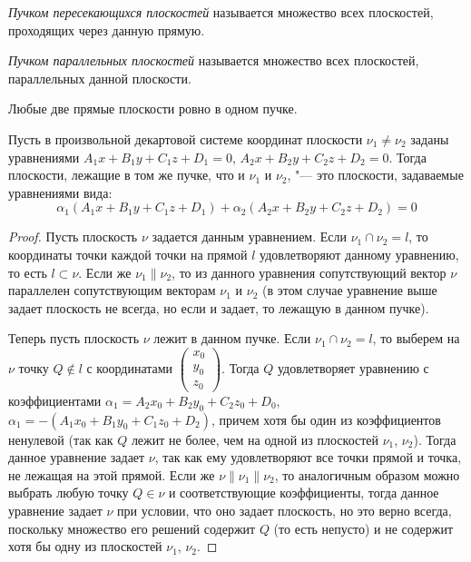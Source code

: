 \begin{definition}
	\textit{Пучком пересекающихся плоскостей} называется множество всех плоскостей, проходящих через данную прямую.
\end{definition}

\begin{definition}
	\textit{Пучком параллельных плоскостей} называется множество всех плоскостей, параллельных данной плоскости.
\end{definition}

\begin{note}
	Любые две прямые плоскости ровно в одном пучке.
\end{note}

\begin{theorem}
	Пусть в произвольной декартовой системе координат плоскости $\nu_1 \ne \nu_2$ заданы уравнениями $A_1x+B_1y+C_1z+D_1=0$, $A_2x+B_2y+C_2z+D_2=0$. Тогда плоскости, лежащие в том же пучке, что и $\nu_1$ и $\nu_2$, "--- это плоскости, задаваемые уравнениями вида:
	\[\alpha_1(A_1x+B_1y+C_1z+D_1) + \alpha_2(A_2x+B_2y+C_2z+D_2) = 0\]
\end{theorem}

\begin{proof}
	Пусть плоскость $\nu$ задается данным уравнением. Если $\nu_1 \cap \nu_2 = l$, то координаты точки каждой точки на прямой $l$ удовлетворяют данному уравнению, то есть $l \subset \nu$. Если же $\nu_1 \parallel \nu_2$, то из данного уравнения сопутствующий вектор $\nu$ параллелен сопутствующим векторам $\nu_1$ и $\nu_2$ (в этом случае уравнение выше задает плоскость не всегда, но если и задает, то лежащую в данном пучке).
	
	Теперь пусть плоскость $\nu$ лежит в данном пучке. Если $\nu_1 \cap \nu_2 = l$, то выберем на $\nu$ точку $Q \not\in l$ с координатами $\begin{pmatrix}x_0\\y_0\\z_0\end{pmatrix}$. Тогда $Q$ удовлетворяет уравнению с коэффициентами $\alpha_1 = A_2x_0+B_2y_0+C_2z_0+D_0$, $\alpha_1 = -(A_1x_0+B_1y_0+C_1z_0+D_2)$, причем хотя бы один из коэффициентов ненулевой (так как $Q$ лежит не более, чем на одной из плоскостей $\nu_1$, $\nu_2$). Тогда данное уравнение задает $\nu$, так как ему удовлетворяют все точки прямой и точка, не лежащая на этой прямой. Если же $\nu \parallel \nu_1 \parallel \nu_2$, то аналогичным образом можно выбрать любую точку $Q \in \nu$ и соответствующие коэффициенты, тогда данное уравнение задает $\nu$ при условии, что оно задает плоскость, но это верно всегда, поскольку множество его решений содержит $Q$ (то есть непусто) и не содержит хотя бы одну из плоскостей $\nu_1$, $\nu_2$.
\end{proof}

